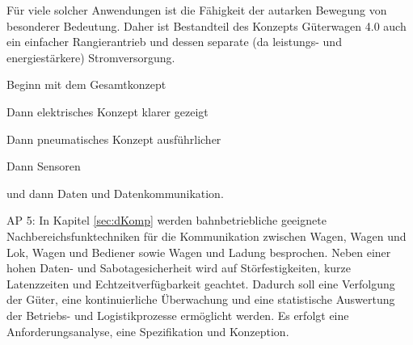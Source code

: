 Für viele solcher Anwendungen ist die Fähigkeit der autarken Bewegung von besonderer Bedeutung. Daher ist Bestandteil des Konzepts Güterwagen 4.0 auch ein einfacher Rangierantrieb und dessen separate (da leistungs- und energiestärkere) Stromversorgung.





Beginn mit dem Gesamtkonzept\par
Dann elektrisches Konzept klarer gezeigt\par
Dann pneumatisches Konzept ausführlicher \par
Dann Sensoren\par
und dann Daten und Datenkommunikation.



AP 5:
In Kapitel \ref{sec:dKomp} werden bahnbetriebliche geeignete Nachbereichsfunktechniken für die Kommunikation zwischen Wagen, Wagen und Lok, Wagen und Bediener sowie Wagen und Ladung besprochen. Neben einer hohen Daten- und Sabotagesicherheit wird auf Störfestigkeiten, kurze Latenzzeiten und Echtzeitverfügbarkeit geachtet.
Dadurch soll eine Verfolgung der Güter, eine kontinuierliche Überwachung und eine statistische Auswertung der Betriebs- und Logistikprozesse ermöglicht werden.
Es erfolgt eine Anforderungsanalyse, eine Spezifikation und Konzeption.